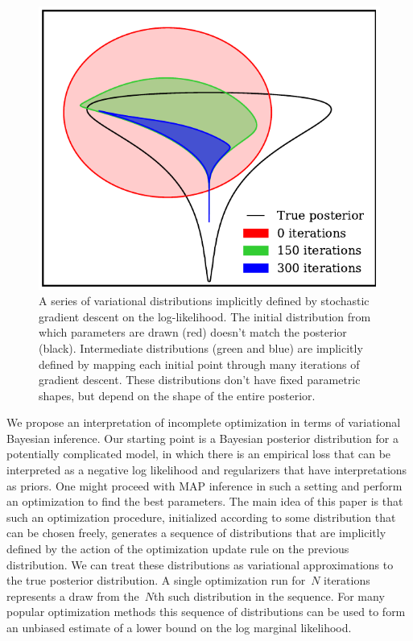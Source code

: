 \documentclass[]{article}
\begin{document}
\begin{figure}[t]
\vskip 0.2in
\begin{center}
\includegraphics[width=\columnwidth]{../experiments/2015_03_02_funnel/2/dists.pdf}
\caption{A series of variational distributions implicitly defined by
  stochastic gradient descent on the log-likelihood.
  The initial distribution from which parameters are drawn (red) doesn't match the posterior (black).
  Intermediate distributions (green and blue) are implicitly defined by mapping each initial point through many iterations of gradient descent.
  These distributions don't have fixed parametric shapes, but depend on the shape of the entire posterior.}
\label{fig:cartoon}
\end{center}
\end{figure}

We propose an interpretation of incomplete optimization in terms of variational Bayesian inference.
Our starting point is a Bayesian posterior distribution for a potentially complicated model, in which there is an empirical loss that can be interpreted as a negative log likelihood and regularizers that have interpretations as priors.
One might proceed with MAP inference in such a setting and perform an optimization to find the best parameters.
The main idea of this paper is that such an optimization procedure, initialized according to some distribution that can be chosen freely, generates a sequence of distributions that are implicitly defined by the action of the optimization update rule on the previous distribution.
We can treat these distributions as variational approximations to the true posterior distribution.
A single optimization run for~$N$ iterations represents a draw from the~$N$th such distribution in the sequence.
For many popular optimization methods this sequence of distributions can be used to form an unbiased estimate of a lower bound on the log marginal likelihood.
\end{document}
